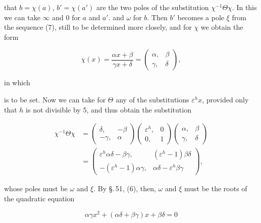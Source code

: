 that $b = \chi(a)$, $b' = \chi(a')$ are the two poles of the substitution
$\chi^{-1}\Theta\chi$. %
In this we can take $\infty$ and 0 for $a$ and $a'$. and $\omega$ for $b$. %
Then $b'$ becomes a pole $\xi$ from the sequence (7),
still to be determined more closely, and for $\chi$ we obtain the form

\[
\chi(x) = \frac{\alpha x + \beta}{\gamma x + \delta} = \begin{pmatrix} \alpha, & \beta \\ \gamma, & \delta \end{pmatrix},
\]

in which


is to be set.
Now we can take for $\Theta$ any of the substitutions $\varepsilon^h x$,
provided only that $h$ is not divisible by 5, and thus obtain the substitution


\[
\begin{aligned}
\chi^{-1}\Theta\chi &= \begin{pmatrix} \delta, & -\beta \\ -\gamma, & \alpha \end{pmatrix}\begin{pmatrix} \varepsilon^h, & 0 \\ 0, & 1 \end{pmatrix}\begin{pmatrix} \alpha, & \beta \\ \gamma, & \delta \end{pmatrix} \\
&= \begin{pmatrix} \varepsilon^h\alpha\delta - \beta\gamma, & (\varepsilon^h-1)\beta\delta \\ -(\varepsilon^h-1)\alpha\gamma, & \alpha\delta - \varepsilon^h\beta\gamma \end{pmatrix},
\end{aligned}
\]

whose poles must be $\omega$ and $\xi$. By \S.\,51, (6), then, $\omega$ and $\xi$
must be the roots of the quadratic equation

\[
\alpha\gamma x^2 + (\alpha\delta + \beta\gamma)x + \beta\delta = 0
\]

